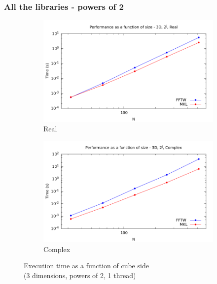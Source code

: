 \documentclass[12pt, a4paper]{article}
\begin{document}
\subsubsection{All the libraries - powers of 2}
\begin{figure}[H]
\captionsetup{width=0.8\linewidth}
\centering
\begin{subfigure}{.5\textwidth}
\centering
\includegraphics[width=.9\linewidth]{graphs/performance/3d-pow2-r.pdf}
\caption{Real}
\label{3DPOW2R}
\end{subfigure}%
\begin{subfigure}{.5\textwidth}
\centering
\includegraphics[width=.9\linewidth]{graphs/performance/3d-pow2-c.pdf}
\caption{Complex}
\label{3DPOW2C}
\end{subfigure}
\caption{Execution time as a function of cube side\\(3 dimensions, powers of 2, 1 thread)}
\label{3DPOW2}
\end{figure}
\end{document}
